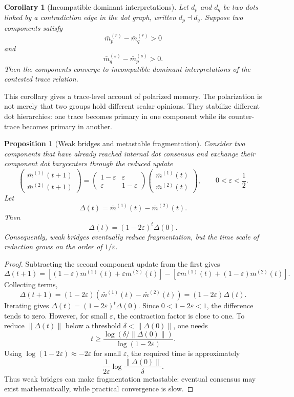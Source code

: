 \documentclass[11pt]{article}
\newtheorem{proposition}{Proposition}
\newtheorem{corollary}{Corollary}
\theoremstyle{remark}
\begin{document}
\begin{corollary}[Incompatible dominant interpretations]
Let $d_p$ and $d_q$ be two dots linked by a contradiction edge in the dot
graph, written $d_p\dashv d_q$. Suppose two components satisfy
$$
\bar m^{(r)}_{p}-\bar m^{(r)}_{q}>0
$$
and
$$
\bar m^{(s)}_{q}-\bar m^{(s)}_{p}>0.
$$
Then the components converge to incompatible dominant interpretations of
the contested trace relation.
\end{corollary}


This corollary gives a trace-level account of polarized memory. The
polarization is not merely that two groups hold different scalar
opinions. They stabilize different dot hierarchies: one trace becomes
primary in one component while its counter-trace becomes primary in
another.

\begin{proposition}[Weak bridges and metastable fragmentation]\label{prop:weak-bridges}
Consider two components that have already reached internal dot consensus
and exchange their component dot barycenters through the reduced update
$$
\begin{pmatrix}
\bar m^{(1)}(t+1)\\
\bar m^{(2)}(t+1)
\end{pmatrix}
=
\begin{pmatrix}
1-\varepsilon & \varepsilon\\
\varepsilon & 1-\varepsilon
\end{pmatrix}
\begin{pmatrix}
\bar m^{(1)}(t)\\
\bar m^{(2)}(t)
\end{pmatrix},
\qquad 0<\varepsilon<\frac{1}{2}.
$$
Let
$$
\Delta(t)=\bar m^{(1)}(t)-\bar m^{(2)}(t).
$$
Then
$$
\Delta(t)=(1-2\varepsilon)^t\Delta(0).
$$
Consequently, weak bridges eventually reduce fragmentation, but the time
scale of reduction grows on the order of $1/\varepsilon$.
\end{proposition}

\begin{proof}
Subtracting the second component update from the first gives
$$
\Delta(t+1)
=[(1-\varepsilon)\bar m^{(1)}(t)+\varepsilon \bar m^{(2)}(t)]
-[\varepsilon \bar m^{(1)}(t)+(1-\varepsilon)\bar m^{(2)}(t)].
$$
Collecting terms,
$$
\Delta(t+1)=(1-2\varepsilon)(\bar m^{(1)}(t)-\bar m^{(2)}(t))
=(1-2\varepsilon)\Delta(t).
$$
Iterating gives $\Delta(t)=(1-2\varepsilon)^t\Delta(0)$. Since
$0<1-2\varepsilon<1$, the difference tends to zero. However, for small
$\varepsilon$, the contraction factor is close to one. To reduce
$\|\Delta(t)\|$ below a threshold $\delta<\|\Delta(0)\|$, one needs
$$
t\geq
\frac{\log(\delta/\|\Delta(0)\|)}{\log(1-2\varepsilon)}.
$$
Using $\log(1-2\varepsilon)\approx -2\varepsilon$ for small
$\varepsilon$, the required time is approximately
$$
\frac{1}{2\varepsilon}\log\frac{\|\Delta(0)\|}{\delta}.
$$
Thus weak bridges can make fragmentation metastable: eventual consensus
may exist mathematically, while practical convergence is slow.
\end{proof}
\end{document}
